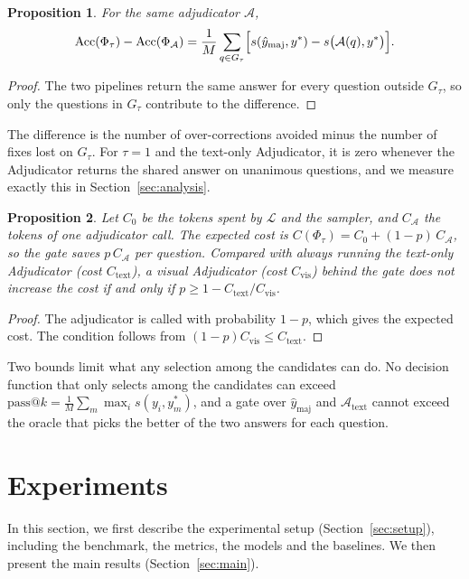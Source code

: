 \documentclass[conference]{IEEEtran}
\newtheorem{proposition}{Proposition}
\begin{document}
\begin{proposition}
\label{prop:acc}
For the same adjudicator $\mathcal{A}$,
\[
\mathrm{Acc}(\Phi_\tau)-\mathrm{Acc}(\Phi_{\mathcal{A}})=\frac{1}{M}\sum_{q\in G_\tau}\Bigl[s(\hat y_{\mathrm{maj}},y^\ast)-s\bigl(\mathcal{A}(q),y^\ast\bigr)\Bigr].
\]
\end{proposition}
\begin{proof}
The two pipelines return the same answer for every question outside $G_\tau$, so only the questions in $G_\tau$ contribute to the difference.
\end{proof}

The difference is the number of over-corrections avoided minus the number of fixes lost on $G_\tau$. For $\tau=1$ and the text-only Adjudicator, it is zero whenever the Adjudicator returns the shared answer on unanimous questions, and we measure exactly this in Section~\ref{sec:analysis}.

\begin{proposition}
\label{prop:cost}
Let $C_0$ be the tokens spent by $\mathcal{L}$ and the sampler, and $C_{\mathcal{A}}$ the tokens of one adjudicator call. The expected cost is $C(\Phi_\tau)=C_0+(1-p)\,C_{\mathcal{A}}$, so the gate saves $p\,C_{\mathcal{A}}$ per question. Compared with always running the text-only Adjudicator (cost $C_{\mathrm{text}}$), a visual Adjudicator (cost $C_{\mathrm{vis}}$) behind the gate does not increase the cost if and only if $p\ge 1-C_{\mathrm{text}}/C_{\mathrm{vis}}$.
\end{proposition}
\begin{proof}
The adjudicator is called with probability $1-p$, which gives the expected cost. The condition follows from $(1-p)C_{\mathrm{vis}}\le C_{\mathrm{text}}$.
\end{proof}

Two bounds limit what any selection among the candidates can do. No decision function that only selects among the candidates can exceed $\mathrm{pass@}k=\frac{1}{M}\sum_m\max_i s(y_i,y^\ast_m)$, and a gate over $\hat y_{\mathrm{maj}}$ and $\mathcal{A}_{\mathrm{text}}$ cannot exceed the oracle that picks the better of the two answers for each question.

\section{Experiments}
\label{sec:experiments}

In this section, we first describe the experimental setup (Section~\ref{sec:setup}), including the benchmark, the metrics, the models and the baselines. We then present the main results (Section~\ref{sec:main}).
\end{document}
